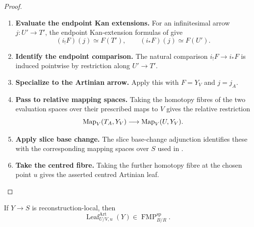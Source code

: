 \begin{proof}
\leavevmode
\begin{enumerate}[label=\textup{(\arabic*)}]
    \item \textbf{Evaluate the endpoint Kan extensions.}
    For an infinitesimal arrow \(j:U'\to T'\), the endpoint Kan-extension formulas
    of  give
    \[
        (i_!F)(j)\simeq F(T'),
        \qquad
        (i_*F)(j)\simeq F(U').
    \]
    \item \textbf{Identify the endpoint comparison.}
    The natural comparison \(i_!F\to i_*F\) is induced pointwise by restriction
    along \(U'\to T'\).
    \item \textbf{Specialize to the Artinian arrow.}
    Apply this with \(F=Y_V\) and \(j=j_A\).
    \item \textbf{Pass to relative mapping spaces.}
    Taking the
    homotopy fibres of the two evaluation spaces over their prescribed maps to
    \(V\) gives the relative restriction
    \[
        \operatorname{Map}_V(T_A,Y_V)\longrightarrow\operatorname{Map}_V(U,Y_V).
    \]
    \item \textbf{Apply slice base change.}
    The slice base-change adjunction identifies these with the corresponding
    mapping spaces over \(S\) used in
    .
    \item \textbf{Take the centred fibre.}
    Taking the further homotopy fibre at the
    chosen point \(u\) gives the asserted centred Artinian leaf.
\end{enumerate}
\end{proof}

\begin{proposition}
\label{prop:reconstruction-local-artinian-leaf-fmp}
If \(Y\to S\) is reconstruction-local, then
\[
    \operatorname{Leaf}^{\mathrm{Art}}_{U/V,u}(Y)
    \in
    \operatorname{FMP}^{\mathrm{sp}}_{B/R}.
\]
\end{proposition}

